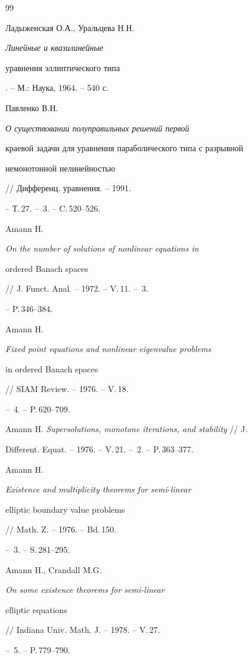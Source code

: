 \begin{thebibliography}{99} 


 




Ладыженская О.А., Уральцева Н.Н. {\em Линейные и квазилинейные 


уравнения эллиптического типа}. -- М.: Наука, 1964. -- 540 с. 




Павленко В.Н. {\em О существовании полуправильных решений первой 


краевой задачи для уравнения параболического типа с разрывной 


немонотонной нелинейностью} // Дифференц. уравнения. -- 1991. 


-- Т.\,27. -- \No\,3. -- C.\,520--526. 




Amann H. {\em On the number of solutions of nonlinear equations in 


ordered Banach spaces} // J. Funct. Anal. -- 1972. -- V.\,11. -- \No\,3. 


-- P.\,346--384. 




Amann H. {\em Fixed point equations and nonlinear eigenvalue problems 


in ordered Banach spaces} // SIAM Review. -- 1976. -- V.\,18. 


-- \No\,4. -- P.\,620--709. 




Amann H. {\em Supersolutions, monotone iterations, and stability} // J. 


Different. Equat. -- 1976. -- V.\,21. -- \No\,2. -- P.\,363--377. 




Amann H. {\em Existence and multiplicity theorems for semi-linear 


elliptic boundary value problems} // Math. Z. -- 1976. -- Bd.\,150. 


-- \No\,3. -- S.\,281--295. 




Amann H., Crandall M.G. {\em On some existence theorems for semi-linear 


elliptic equations} // Indiana Univ. Math. J. -- 1978. -- V.\,27. 


-- \No\,5. -- P.\,779--790. 





\end{thebibliography}
